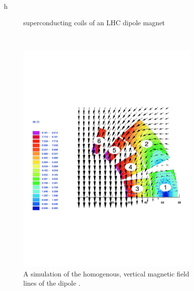 \begin{figure}{h}
\begin{subfigure}[h]{0.450\textwidth}
{          superconducting coils of an LHC dipole magnet \cite{LHC:LHC_lhc_dipole_dual_bore_image}}\label{fig:lhc_dipole_collarAndCoils}
      \end{subfigure}
      ~ %
      \begin{subfigure}[h]{0.450\textwidth}
        \includegraphics[width=\textwidth]{Figures/LHC_Diagrams/LHC_Dipole_Field.pdf}
        \caption{A simulation of the homogenous, vertical magnetic field lines of the
          dipole \cite{LHC:LHC_lhc_dipole_field_image}. }\label{fig:lhc_dipole_field}
      \end{subfigure}
       ~ %
      \begin{subfigure}[h]{0.450\textwidth}

\end{subfigure}
\end{figure}
